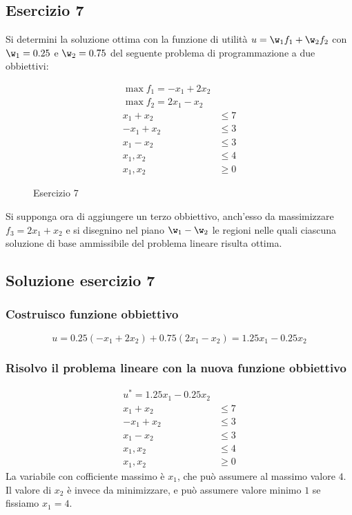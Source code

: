 \documentclass[\main/main.tex]{subfiles}
\begin{document}
\subsection{Esercizio 7}
Si determini la soluzione ottima con la funzione di utilità $u = \w_1f_1 + \w_2f_2$ con $\w_1 = 0.25$ e $\w_2 = 0.75$ del seguente problema di programmazione a due obbiettivi:

\begin{figure}
  \begin{align*}
    \max f_1 = -x_1 + 2x_2 \\
    \max f_2 = 2x_1 - x_2  \\
    x_1 + x_2  & \leq 7    \\
    -x_1 + x_2 & \leq 3    \\
    x_1 - x_2  & \leq 3    \\
    x_1, x_2   & \leq 4    \\
    x_1, x_2   & \geq 0
  \end{align*}
  \caption{Esercizio 7}
\end{figure}

Si supponga ora di aggiungere un terzo obbiettivo, anch'esso da massimizzare $f_3 = 2x_1 + x_2$ e si disegnino nel piano $\w_1-\w_2$ le regioni nelle quali ciascuna soluzione di base ammissibile del problema lineare risulta ottima.

\subsection{Soluzione esercizio 7}

\subsubsection*{Costruisco funzione obbiettivo}

\[
  u = 0.25(-x_1 + 2x_2) + 0.75(2x_1-x_2) = 1.25x_1 - 0.25x_2
\]
\subsubsection*{Risolvo il problema lineare con la nuova funzione obbiettivo}

\begin{align*}
  u^* = 1.25x_1 - 0.25x_2 \\
  x_1 + x_2  & \leq 7     \\
  -x_1 + x_2 & \leq 3     \\
  x_1 - x_2  & \leq 3     \\
  x_1, x_2   & \leq 4     \\
  x_1, x_2   & \geq 0
\end{align*}
La variabile con cofficiente massimo è $x_1$, che può assumere al massimo valore $4$. Il valore di $x_2$ è invece da minimizzare, e può assumere valore minimo $1$ se fissiamo $x_1=4$.
\end{document}
